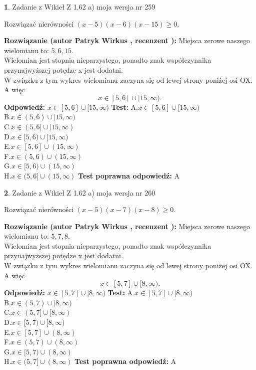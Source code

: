 \documentclass[12pt, a4paper]{article}
\theoremstyle{definition} %
\newtheorem{zad}{}
\newcommand{\zadStart}[1]{\begin{zad}#1\newline}
\newcommand{\zadStop}{\end{zad}}
\newcommand{\rozwStart}[2]{\noindent \textbf{Rozwiązanie (autor #1 , recenzent #2): }\newline}
\newcommand{\rozwStop}{\newline}
\newcommand{\odpStart}{\noindent \textbf{Odpowiedź:}\newline}
\newcommand{\odpStop}{\newline}
\newcommand{\testStart}{\noindent \textbf{Test:}\newline}
\newcommand{\testStop}{\newline}
\newcommand{\kluczStart}{\noindent \textbf{Test poprawna odpowiedź:}\newline}
\newcommand{\kluczStop}{\newline}
\begin{document}
\zadStart{Zadanie z Wikieł Z 1.62 a) moja wersja nr 259}

Rozwiązać nierówności $(x-5)(x-6)(x-15)\ge0$.
\zadStop
\rozwStart{Patryk Wirkus}{}
Miejsca zerowe naszego wielomianu to: $5, 6, 15$.\\
Wielomian jest stopnia nieparzystego, ponadto znak współczynnika przy\linebreak najwyższej potędze x jest dodatni.\\ W związku z tym wykres wielomianu zaczyna się od lewej strony poniżej osi OX. A więc $$x \in [5,6] \cup [15,\infty).$$
\rozwStop
\odpStart
$x \in [5,6] \cup [15,\infty)$
\odpStop
\testStart
A.$x \in [5,6] \cup [15,\infty)$\\
B.$x \in (5,6) \cup [15,\infty)$\\
C.$x \in (5,6] \cup [15,\infty)$\\
D.$x \in [5,6) \cup [15,\infty)$\\
E.$x \in [5,6] \cup (15,\infty)$\\
F.$x \in (5,6) \cup (15,\infty)$\\
G.$x \in [5,6) \cup (15,\infty)$\\
H.$x \in (5,6] \cup (15,\infty)$
\testStop
\kluczStart
A
\kluczStop



\zadStart{Zadanie z Wikieł Z 1.62 a) moja wersja nr 260}

Rozwiązać nierówności $(x-5)(x-7)(x-8)\ge0$.
\zadStop
\rozwStart{Patryk Wirkus}{}
Miejsca zerowe naszego wielomianu to: $5, 7, 8$.\\
Wielomian jest stopnia nieparzystego, ponadto znak współczynnika przy\linebreak najwyższej potędze x jest dodatni.\\ W związku z tym wykres wielomianu zaczyna się od lewej strony poniżej osi OX. A więc $$x \in [5,7] \cup [8,\infty).$$
\rozwStop
\odpStart
$x \in [5,7] \cup [8,\infty)$
\odpStop
\testStart
A.$x \in [5,7] \cup [8,\infty)$\\
B.$x \in (5,7) \cup [8,\infty)$\\
C.$x \in (5,7] \cup [8,\infty)$\\
D.$x \in [5,7) \cup [8,\infty)$\\
E.$x \in [5,7] \cup (8,\infty)$\\
F.$x \in (5,7) \cup (8,\infty)$\\
G.$x \in [5,7) \cup (8,\infty)$\\
H.$x \in (5,7] \cup (8,\infty)$
\testStop
\kluczStart
A
\kluczStop
\end{document}
